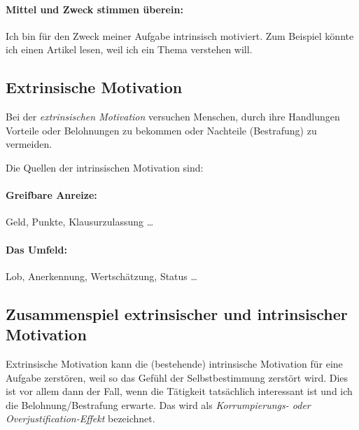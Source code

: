 \paragraph{Mittel und Zweck stimmen überein:} Ich bin für den Zweck meiner Aufgabe intrinsisch motiviert. Zum Beispiel könnte ich einen Artikel lesen, weil ich ein Thema verstehen will.


\subsection{Extrinsische Motivation}
\label{extrinsische-motivation}

Bei der \emph{extrinsischen Motivation} versuchen Menschen, durch ihre Handlungen Vorteile oder Belohnungen zu bekommen oder Nachteile (Bestrafung) zu vermeiden.

Die Quellen der intrinsischen Motivation sind:

\paragraph{Greifbare Anreize:} Geld, Punkte, Klausurzulassung \ldots

\paragraph{Das Umfeld:} Lob, Anerkennung, Wertschätzung, Status \ldots
{}

\subsection{Zusammenspiel extrinsischer und intrinsischer Motivation}

Extrinsische Motivation kann die (bestehende) intrinsische Motivation für eine Aufgabe zerstören, weil so das Gefühl der Selbstbestimmung zerstört wird. Dies ist vor allem dann der Fall, wenn die Tätigkeit tatsächlich interessant ist und ich die Belohnung/Bestrafung erwarte. Das wird als \emph{Korrumpierungs- oder Overjustification-Effekt} bezeichnet.~\cite{extrinsic-effects}

